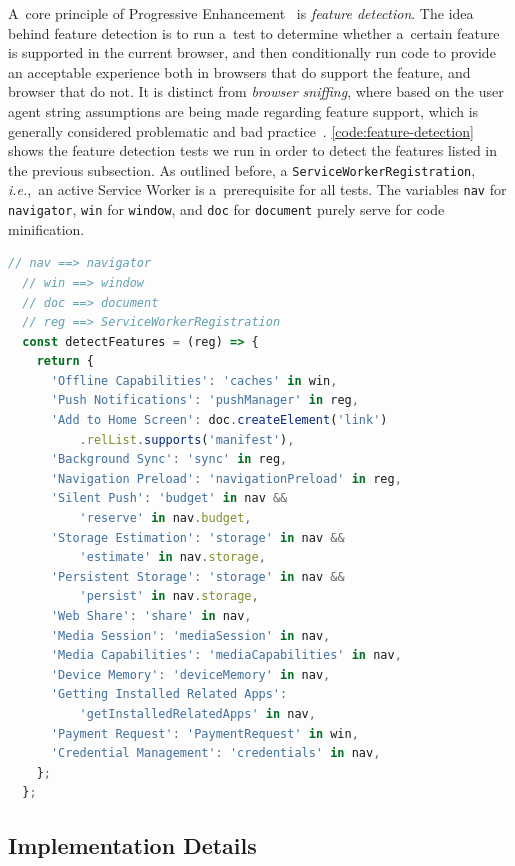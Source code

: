 \documentclass[sigconf]{acmart}
\begin{document}
A~core principle of Progressive Enhancement~\cite{champeon2003progressiveenhancement}
is \emph{feature detection}.
The idea behind feature detection is to run a~test to determine
whether a~certain feature is supported in the current browser,
and then conditionally run code to provide an acceptable experience
both in browsers that do support the feature, and browser that do not.
It is distinct from \emph{browser sniffing}, where based on the user agent string
assumptions are being made regarding feature support,
which is generally considered problematic and bad practice~\cite{andersen2008useragent}.
\autoref{code:feature-detection} shows the feature detection tests
we run in order to detect the features listed in the previous subsection.
As outlined before, a \texttt{ServiceWorkerRegistration},
\emph{i.e.},\ an active Service Worker is a~prerequisite for all tests.  
The variables \texttt{nav} for \texttt{navigator},
\texttt{win} for \texttt{window}, and \texttt{doc} for \texttt{document}
purely serve for code minification.

\begin{lstlisting}[caption={Feature detection of various \textsc{pwa} features.},
  label=code:feature-detection, language=JavaScript, float=htb] 
  // nav ==> navigator
  // win ==> window
  // doc ==> document
  // reg ==> ServiceWorkerRegistration
  const detectFeatures = (reg) => {
    return {
      'Offline Capabilities': 'caches' in win,
      'Push Notifications': 'pushManager' in reg,
      'Add to Home Screen': doc.createElement('link')
          .relList.supports('manifest'),
      'Background Sync': 'sync' in reg,
      'Navigation Preload': 'navigationPreload' in reg,
      'Silent Push': 'budget' in nav &&
          'reserve' in nav.budget,
      'Storage Estimation': 'storage' in nav &&
          'estimate' in nav.storage,
      'Persistent Storage': 'storage' in nav &&
          'persist' in nav.storage,
      'Web Share': 'share' in nav,
      'Media Session': 'mediaSession' in nav,
      'Media Capabilities': 'mediaCapabilities' in nav,
      'Device Memory': 'deviceMemory' in nav,
      'Getting Installed Related Apps':
          'getInstalledRelatedApps' in nav,
      'Payment Request': 'PaymentRequest' in win,
      'Credential Management': 'credentials' in nav,
    };
  };    
\end{lstlisting}  

\subsection{Implementation Details}
\end{document}
